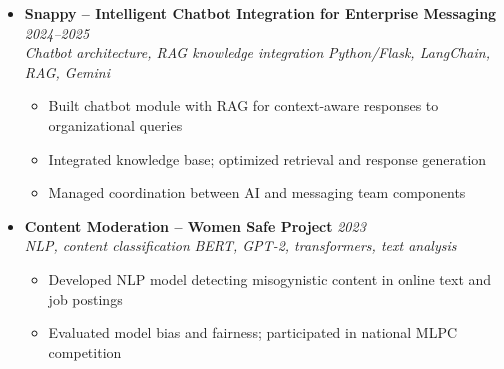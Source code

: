 \documentclass[a4paper,11pt]{article}
\begin{document}
\begin{itemize}[leftmargin=*, label={-}]
\item \textbf{Snappy -- Intelligent Chatbot Integration for Enterprise Messaging} \hfill \textit{2024--2025} \\
\textit{Chatbot architecture, RAG knowledge integration} \hfill \textit{Python/Flask, LangChain, RAG, Gemini}
\vspace{-2pt}
    \begin{itemize}[leftmargin=0.4cm, nosep, label=\tiny$\bullet$]
        \item \small{Built chatbot module with RAG for context-aware responses to organizational queries}
        \item \small{Integrated knowledge base; optimized retrieval and response generation}
        \item \small{Managed coordination between AI and messaging team components}
    \end{itemize}
\vspace{3pt}

\item \textbf{Content Moderation -- Women Safe Project} \hfill \textit{2023} \\
\textit{NLP, content classification} \hfill \textit{BERT, GPT-2, transformers, text analysis}
\vspace{-2pt}
    \begin{itemize}[leftmargin=0.4cm, nosep, label=\tiny$\bullet$]
        \item \small{Developed NLP model detecting misogynistic content in online text and job postings}
        \item \small{Evaluated model bias and fairness; participated in national MLPC competition}
    \end{itemize}
\vspace{3pt}

\end{itemize}
\end{document}
